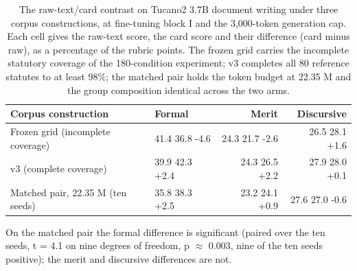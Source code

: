 \documentclass{IOS-Book-Article}
\begin{document}
\begin{table}[!ht]
\centering
\caption{The raw-text/card contrast on Tucano2 3.7B document writing under three corpus constructions, at fine-tuning block I and the 3,000-token generation cap. Each cell gives the raw-text score, the card score and their difference (card minus raw), as a percentage of the rubric points. The frozen grid carries the incomplete statutory coverage of the 180-condition experiment; v3 completes all 80 reference statutes to at least 98\%; the matched pair holds the token budget at 22.35 M and the group composition identical across the two arms.}
\footnotesize\setlength{\tabcolsep}{3pt}
\begin{tabular}{llrr}
\hline
\textbf{Corpus construction} & \textbf{Formal} & \textbf{Merit} & \textbf{Discursive} \\
\hline
Frozen grid (incomplete coverage) & 41.4 \textperiodcentered{} 36.8 \textperiodcentered{} -4.6 & 24.3 \textperiodcentered{} 21.7 \textperiodcentered{} -2.6 & 26.5 \textperiodcentered{} 28.1 \textperiodcentered{} +1.6 \\
v3 (complete coverage) & 39.9 \textperiodcentered{} 42.3 \textperiodcentered{} +2.4 & 24.3 \textperiodcentered{} 26.5 \textperiodcentered{} +2.2 & 27.9 \textperiodcentered{} 28.0 \textperiodcentered{} +0.1 \\
Matched pair, 22.35 M (ten seeds) & 35.8 \textperiodcentered{} 38.3 \textperiodcentered{} +2.5 & 23.2 \textperiodcentered{} 24.1 \textperiodcentered{} +0.9 & 27.6 \textperiodcentered{} 27.0 \textperiodcentered{} -0.6 \\
\hline
\end{tabular}
\par\vspace{3pt}\begin{minipage}{\textwidth}\footnotesize On the matched pair the formal difference is significant (paired over the ten seeds, t = 4.1 on nine degrees of freedom, p $\approx$ 0.003, nine of the ten seeds positive); the merit and discursive differences are not.\end{minipage}
\end{table}
\end{document}
